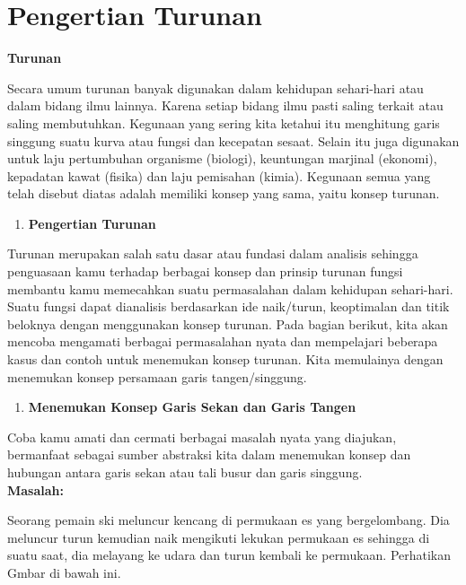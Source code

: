 \documentclass[11pt,fleqn]{book} %
\begin{document}
\section{Pengertian Turunan}
\begin{center}
\LARGE \textbf{Turunan}
\end{center}

\noindent
Secara umum turunan banyak digunakan dalam kehidupan sehari-hari atau dalam bidang ilmu lainnya. Karena setiap bidang ilmu pasti saling terkait atau saling membutuhkan. Kegunaan yang sering kita ketahui itu menghitung garis singgung suatu kurva atau fungsi dan kecepatan sesaat. Selain itu juga digunakan untuk laju pertumbuhan organisme (biologi), keuntungan marjinal (ekonomi), kepadatan kawat (fisika) dan laju pemisahan (kimia). Kegunaan semua yang telah disebut diatas adalah memiliki konsep yang sama, yaitu konsep turunan.

\noindent
\begin{enumerate}
\item \textbf{Pengertian Turunan }
\end{enumerate}

\noindent 
Turunan merupakan salah satu dasar atau fundasi dalam analisis sehingga penguasaan kamu terhadap berbagai konsep dan prinsip turunan fungsi membantu kamu memecahkan suatu permasalahan dalam kehidupan sehari-hari. Suatu fungsi dapat dianalisis berdasarkan ide naik/turun, keoptimalan dan titik beloknya dengan menggunakan konsep turunan. Pada bagian berikut, kita akan mencoba mengamati berbagai permasalahan nyata dan mempelajari beberapa kasus dan contoh untuk menemukan konsep turunan. Kita memulainya dengan menemukan konsep persamaan garis tangen/singgung.

\noindent 
\begin{enumerate}
\item \textbf{Menemukan Konsep Garis Sekan dan Garis Tangen}
\end{enumerate}

\noindent 
Coba kamu amati dan cermati berbagai masalah nyata yang diajukan, bermanfaat sebagai sumber abstraksi kita dalam menemukan konsep dan hubungan antara garis sekan atau tali busur dan garis singgung.\\

\noindent 
\textbf{Masalah:}

\noindent 
Seorang pemain ski meluncur kencang di permukaan es yang bergelombang. Dia meluncur turun kemudian naik mengikuti lekukan permukaan es sehingga di suatu saat, dia melayang ke udara dan turun kembali ke permukaan. Perhatikan Gmbar di bawah ini.
\end{document}
